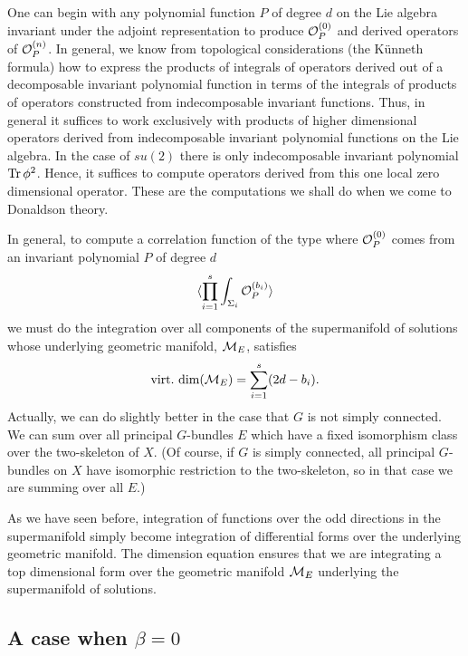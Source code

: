 \documentclass[10pt]{article}
\begin{document}
One can begin with any 
polynomial function $P$ of degree $d$ on the Lie algebra invariant under
the adjoint 
representation to produce ${\cal O}_P^{(0)}$ and derived  operators of
${\cal O}^{(n)}_P$.  In general, we know from topological considerations
(the K\"unneth formula) how to express the products of integrals of
operators derived out of a decomposable invariant polynomial function
in terms of the integrals of products of operators constructed from
indecomposable invariant functions. Thus, in general it suffices to
work exclusively with products of higher dimensional operators derived
from indecomposable invariant polynomial functions on the Lie algebra.
In the case of $su(2)$
there is only indecomposable invariant polynomial ${\rm Tr}\,\phi^2$.
Hence, it suffices to compute operators derived from this one local
zero dimensional operator. These are the computations we shall do when
we come to Donaldson theory.



In general, to compute a correlation function of the type where ${\cal
O}_P^{(0)}$ 
comes from an invariant polynomial $P$ of degree $d$
$$\langle \prod_{i=1}^s\int_{\Sigma_i}{\cal O}_P^{(b_i)}\rangle$$ 
we must do the integration over all components of the supermanifold of
solutions whose underlying geometric manifold, ${\cal M}_E$, satisfies
$${\rm virt.\ dim}({\cal M}_E)=\sum_{i=1}^s(2d-b_i).$$
Actually, we can do slightly better in the case that $G$ is not simply
connected. We can sum over all principal $G$-bundles $E$
which have a fixed isomorphism class over the two-skeleton of $X$.
(Of course, if $G$ is simply connected, all principal $G$-bundles on
$X$ have isomorphic restriction to the two-skeleton, so in that case
we are summing over all $E$.)



As we have
seen before,  integration of functions over the odd directions in the
supermanifold simply become
integration of differential forms over
the underlying geometric manifold.  The dimension equation ensures
that we are integrating a top dimensional form over the geometric
manifold ${\cal M}_E$ underlying the supermanifold of solutions. 




\subsection{A case when $\beta=0$}
\end{document}
